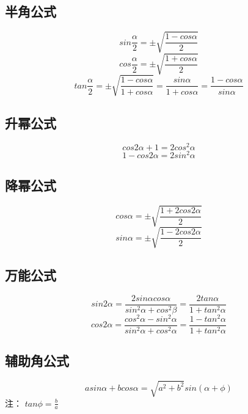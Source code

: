 \subsection{半角公式}
\begin{equation}
sin\frac{\alpha}{2} = \pm\sqrt{\frac{1-cos\alpha}{2}}
\end{equation}
\begin{equation}
cos\frac{\alpha}{2}= \pm\sqrt{\frac{1+cos\alpha}{2}}
\end{equation}
\begin{equation}
tan\frac{\alpha}{2} = \pm\sqrt{\frac{1-cos\alpha}{1+cos\alpha}} = \frac{sin\alpha}{1+cos\alpha} = \frac{1-cos\alpha}{sin\alpha}
\end{equation}

\subsection{升幂公式}
\begin{equation}
cos2\alpha + 1 = 2cos^2\alpha
\end{equation}
\begin{equation}
1-cos2\alpha = 2sin^2\alpha
\end{equation}

\subsection{降幂公式}
\begin{equation}
cos\alpha = \pm\sqrt{\frac{1+2cos2\alpha}{2}}
\end{equation}
\begin{equation}
sin\alpha = \pm\sqrt{\frac{1-2cos2\alpha}{2}}
\end{equation}

\subsection{万能公式}
\begin{equation}
sin2\alpha = \frac{2sin\alpha cos\alpha}{sin^2\alpha + cos^2\beta} = \frac{2tan\alpha}{1+tan^2\alpha}
\end{equation}
\begin{equation}
cos2\alpha = \frac{cos^2\alpha-sin^2\alpha}{sin^2\alpha+cos^2\alpha} = \frac{1-tan^2\alpha}{1+tan^2\alpha}
\end{equation}

\subsection{辅助角公式}
\begin{equation}
asin\alpha + bcos\alpha = \sqrt{a^2+b^2}sin(\alpha + \phi)
\end{equation}
注： $tan\phi = \frac{b}{a}$

